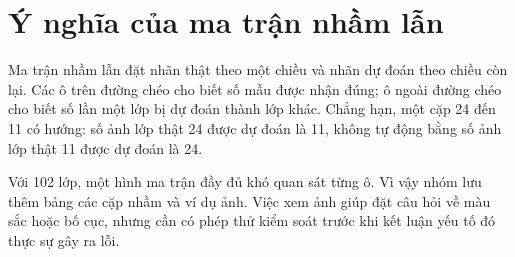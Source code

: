 \section{Ý nghĩa của ma trận nhầm lẫn}
Ma trận nhầm lẫn đặt nhãn thật theo một chiều và nhãn dự đoán theo chiều còn lại. Các ô trên đường chéo cho biết số mẫu được nhận đúng; ô ngoài đường chéo cho biết số lần một lớp bị dự đoán thành lớp khác. Chẳng hạn, một cặp 24 đến 11 có hướng: số ảnh lớp thật 24 được dự đoán là 11, không tự động bằng số ảnh lớp thật 11 được dự đoán là 24.

Với 102 lớp, một hình ma trận đầy đủ khó quan sát từng ô. Vì vậy nhóm lưu thêm bảng các cặp nhầm và ví dụ ảnh. Việc xem ảnh giúp đặt câu hỏi về màu sắc hoặc bố cục, nhưng cần có phép thử kiểm soát trước khi kết luận yếu tố đó thực sự gây ra lỗi.
